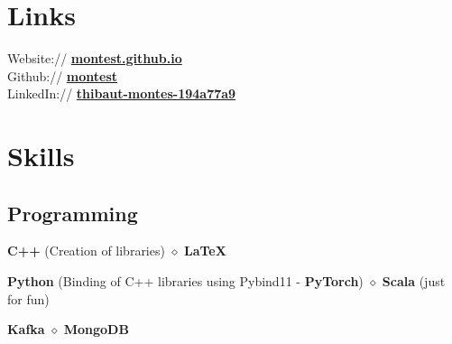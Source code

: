 \documentclass[]{deedy-resume-openfont}
\begin{document}
\begin{minipage}[t]{0.33\textwidth}

	\vspace{\topsep}
	\vspace{\topsep}
	\section{Links}
	Website:// \href{https://montest.github.io}{\bf montest.github.io} \\
	Github:// \href{https://github.com/montest}{\bf montest} \\
	LinkedIn:// \href{https://www.linkedin.com/in/thibaut-montes-194a77a9}{\bf thibaut-montes-194a77a9}


	\vspace{\topsep}
	\vspace{\topsep}
	\section{Skills}

	\subsection{Programming}
	\vspace{\topsep}
	\begin{tightemize}
		\item {}
		\textbf{C++} (Creation of libraries) $\diamond$ \textbf{\LaTeX} \\
		\item {}
		\textbf{Python} (Binding of C++ libraries using Pybind11 - \textbf{PyTorch}) $\diamond$ \textbf{Scala} (just for fun) \\
		\item {}
		\textbf{Kafka} $\diamond$ \textbf{MongoDB}
	\end{tightemize}


\end{minipage}
\end{document}

